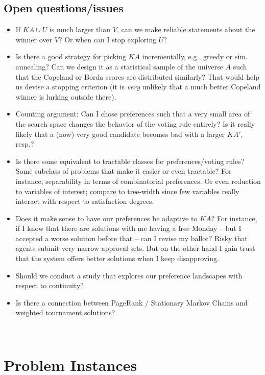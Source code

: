 \documentclass[10pt,a4paper,fleqn]{article}
\begin{document}
\subsection{Open questions/issues}

\begin{itemize}

\item If $\mathit{KA} \cup U$ is much larger than $V$, can we make reliable statements about the winner over $V$?
Or when can I stop exploring $U$?
\item Is there a good strategy for picking $\mathit{KA}$ incrementally, e.g., greedy or sim. annealing? Can we design 
it as a statistical sample of the universe $A$ such that the Copeland or Borda scores are distributed similarly? That 
would help us devise a stopping criterion (it is \emph{very} unlikely that a much better Copeland winner is lurking outside there).
\item Counting argument: Can I chose preferences such that a very small area of the search space changes the behavior
of the voting rule entirely? Is it really likely that a (now) very good candidate becomes bad with a larger $\mathit{KA}'$, resp.?
\item Is there some equivalent to tractable classes for preferences/voting rules? Some subclass of problems that make it easier or even 
tractable? For instance, separability in terms of combinatorial preferences. Or even reduction to variables of interest; compare to tree-width since
few variables really interact with respect to satisfaction degrees.
\item Does it make sense to have our preferences be adaptive to $\mathit{KA}$? For instance, if I know that there are solutions
with me having a free Monday -- but I accepted a worse solution before that -- can I revise my ballot? Risky that agents 
submit very narrow approval sets. But on the other hand I gain trust that the system offers better solutions when I keep disapproving.
\item Should we conduct a study that explores our preference landscapes with respect to continuity?
\item Is there a connection between PageRank / Stationary Markov Chains and weighted tournament solutions?
\end{itemize}

\
\section{Problem Instances}
\end{document}
